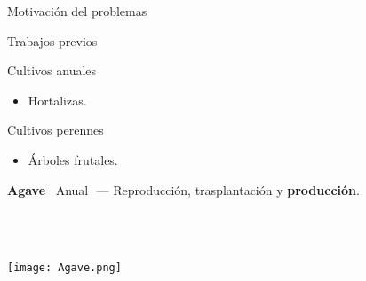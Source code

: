 \documentclass[aspectratio=169]{beamer}
\begin{document}
\begin{frame}{Motivación del problemas}
	\begin{block}{\centering Trabajos previos}
		\begin{minipage}{0.5\textwidth}
			Cultivos anuales
			\begin{itemize}
				\item Hortalizas.
			\end{itemize}
		\end{minipage}%
		\begin{minipage}{0.5\textwidth}
			Cultivos perennes
			\begin{itemize}
				\item Árboles frutales.
			\end{itemize}
		\end{minipage}
	\end{block}
	\pause
	\centering\begin{minipage}{0.75\textwidth}
		\begin{block}{\bf Agave}
			\pause\,\,\,Anual\,\, --- Reproducción, trasplantación y {\bf producción}.\\
		\end{block}
	\end{minipage}

	\,\\
	
	\phantom{\centering \Large  Simultáneamente, anual y perenne.}\\
	\begin{minipage}{0.5\textwidth}
	\vspace{-1.5cm}\raggedright\texttt{[image: Agave.png]}\hfill
\end{minipage}%
\begin{minipage}{0.5\textwidth}
\end{minipage}
\end{frame}
\end{document}
